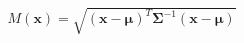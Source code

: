 \documentclass[preview]{standalone}
\begin{document}
\begin{align*}
M(\mathbf{x}) = \sqrt{(\mathbf{x} - \boldsymbol{\mu})^T \boldsymbol{\Sigma}^{-1} (\mathbf{x} - \boldsymbol{\mu})}
\end{align*}
\end{document}
